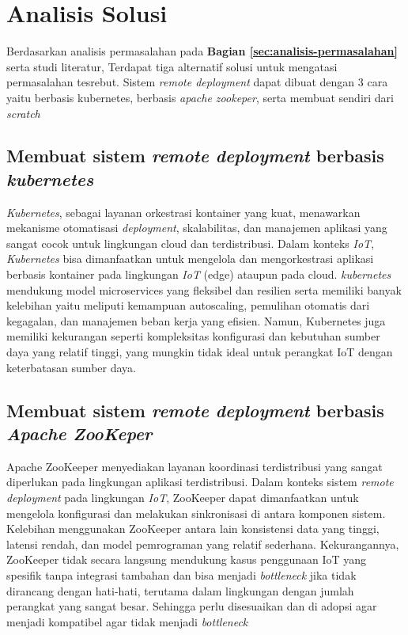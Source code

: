 \section{Analisis Solusi}
\label{sec:analisis-solusi}

Berdasarkan analisis permasalahan pada \textbf{Bagian \ref{sec:analisis-permasalahan}} serta studi literatur, Terdapat tiga alternatif solusi untuk mengatasi permasalahan tesrebut. Sistem \textit{remote deployment} dapat dibuat dengan 3 cara yaitu berbasis kubernetes, berbasis \textit{apache zookeper}, serta membuat sendiri dari \textit{scratch}

\subsection{Membuat sistem \textit{remote deployment} berbasis \textit{kubernetes}}
\textit{Kubernetes}, sebagai layanan orkestrasi kontainer yang kuat, menawarkan mekanisme otomatisasi \textit{deployment}, skalabilitas, dan manajemen aplikasi yang sangat cocok untuk lingkungan cloud dan terdistribusi. Dalam konteks \textit{IoT}, \textit{Kubernetes} bisa dimanfaatkan untuk mengelola dan mengorkestrasi aplikasi berbasis kontainer pada lingkungan \textit{IoT} (edge) ataupun pada cloud. \textit{kubernetes} mendukung model microservices yang fleksibel dan resilien serta memiliki banyak kelebihan yaitu  meliputi kemampuan autoscaling, pemulihan otomatis dari kegagalan, dan manajemen beban kerja yang efisien. Namun, Kubernetes juga memiliki kekurangan seperti kompleksitas konfigurasi dan kebutuhan sumber daya yang relatif tinggi, yang mungkin tidak ideal untuk perangkat IoT dengan keterbatasan sumber daya.

\subsection{Membuat sistem \textit{remote deployment} berbasis \textit{Apache ZooKeper}}
Apache ZooKeeper menyediakan layanan koordinasi terdistribusi yang sangat diperlukan pada lingkungan aplikasi terdistribusi. Dalam konteks sistem \textit{remote deployment} pada lingkungan \textit{IoT}, ZooKeeper dapat dimanfaatkan untuk mengelola konfigurasi dan melakukan sinkronisasi di antara komponen sistem. Kelebihan menggunakan ZooKeeper antara lain konsistensi data yang tinggi, latensi rendah, dan model pemrograman yang relatif sederhana. Kekurangannya, ZooKeeper tidak secara langsung mendukung kasus penggunaan IoT yang spesifik tanpa integrasi tambahan dan bisa menjadi \textit{bottleneck} jika tidak dirancang dengan hati-hati, terutama dalam lingkungan dengan jumlah perangkat yang sangat besar. Sehingga perlu disesuaikan dan di adopsi agar menjadi kompatibel agar tidak menjadi \textit{bottleneck}

